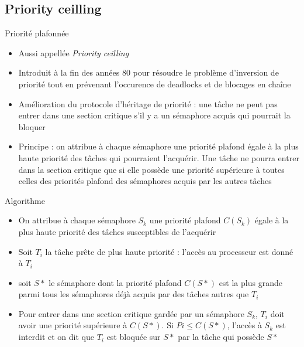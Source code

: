 \subsection{Priority ceilling}

\begin{frame}{Priorité plafonnée}
  \begin{itemize} 
  \item Aussi appellée \emph{Priority ceilling}
  \item Introduit  à la  fin des années  80 pour résoudre  le problème
    d'inversion de priorité tout en prévenant l'occurence de deadlocks
    et de blocages en chaîne
  \item Amélioration  du protocole d'héritage de priorité  : une tâche
    ne peut pas entrer dans une section critique s'il y a un sémaphore
    acquis qui pourrait la bloquer
  \item Principe : on attribue à chaque sémaphore une priorité plafond
    égale  à  la  plus   haute  priorité  des  tâches  qui  pourraient
    l'acquérir. Une  tâche ne pourra  entrer dans la  section critique
    que si  elle possède une  priorité supérieure à toutes  celles des
    priorités plafond des sémaphores acquis par les autres tâches
  \end{itemize} 
\end{frame} 

\begin{frame}{Algorithme}
  \begin{itemize} 
  \item  On attribue  à chaque  sémaphore $S_k$  une  priorité plafond
    $C(S_k)$ égale à la plus haute priorité des tâches susceptibles de
    l'acquérir
  \item Soit $T_i$  la tâche prête de plus  haute priorité : l'accès
    au processeur est donné à $T_i$
  \item soit $S*$ le sémaphore dont la priorité plafond $C(S*)$ est la
    plus grande parmi  tous les sémaphores déjà acquis  par des tâches
    autres que $T_i$
  \item Pour entrer dans une  section critique gardée par un sémaphore
    $S_k$, $T_i$ doit avoir une  priorité supérieure à $C(S*)$. Si $Pi
    \le C(S*)$, l'accès  à $S_k$ est interdit et on  dit que $T_i$ est
    bloquée sur $S*$ par la tâche qui possède $S*$
  \end{itemize} 
\end{frame} 

